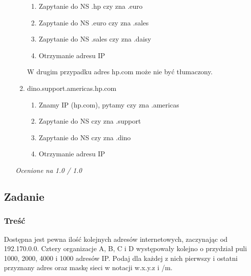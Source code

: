 \begin{enumerate}[A]
\begin{enumerate}
\begin{enumerate}[1]
							\item Zapytanie do NS .hp czy zna .euro
							\item Zapytanie do NS .euro czy zna .sales
							\item Zapytanie do NS .sales czy zna .daisy
							\item Otrzymanie adresu IP
						\end{enumerate}
						W drugim przypadku adres hp.com może nie być tłumaczony.
						\item dino.support.americas.hp.com
						\begin{enumerate}[1]
							\item Znamy IP (hp.com), pytamy czy zna .americas
							\item Zapytanie do NS czy zna .support
							\item Zapytanie do NS czy zna .dino
							\item Otrzymanie adresu IP
						\end{enumerate}
					\end{enumerate}
					\small{ \emph{Ocenione na 1.0 / 1.0}}
			\end{enumerate}
	\subsection{Zadanie}
		\subsubsection{Treść}
			Dostępna jest pewna ilość kolejnych adresów internetowych, zaczynając od 192.170.0.0. Cztery organizacje A, B, C i D występowały kolejno o przydział puli 1000, 2000, 4000 i 1000 adresów IP. Podaj dla każdej z nich pierwszy i ostatni przyznany adres oraz maskę sieci w notacji w.x.y.z i /m.
